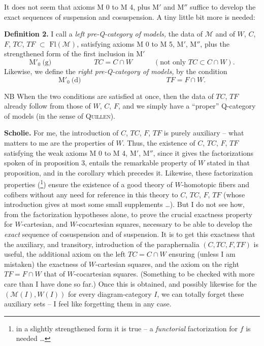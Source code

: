 \documentclass[11pt]{article}
\newcommand{\printedpage}[1]{\marginpar{\footnotesize p.~#1}}
\newcommand{\msp}[1]{\marginpar{\footnotesize [#1]}}
\newcommand{\cM}{\mathcal{M}}
\newcommand{\Fl}{\mathrm{Fl}}
\begin{document}
\msp{page 12}It does not seem that axioms M 0 to M 4, plus M$'$ and M$''$ suffice to develop the exact sequences of suspension and cosuspension. A tiny little bit more is needed:

\printedpage{8}
\textbf{Definition 2.} I call a \textit{left pre-Q-category of models,} the data of $\cM$ and of $W$, $C$, $F$, $TC$, $TF$ $\subset$ $\Fl(\cM)$, satisfying axioms M 0 to M 5, M$'$, M$''$, plus the strengthened form of the first inclusion in M$'$
\[
\text{M}'_0\ \text{(g)}\qquad\qquad\qquad TC=C\cap W\qquad\quad(\text{not only } TC\subset C\cap W).
\]
Likewise, we define the \textit{right pre-Q-category of models,} by the condition
\[
\text{M}'_0\ \text{(d)}\qquad\qquad\qquad\qquad\qquad\qquad TF=F\cap W.
\]

NB When the two conditions are satisfied at once, then the data of $TC$, $TF$ already follow from those of $W$, $C$, $F$, and we simply have a ``proper'' Q-category of models (in the sense of \textsc{Quillen}).

\textbf{Scholie.} For me, the introduction of $C$, $TC$, $F$, $TF$ is purely auxiliary – what matters to me are the properties of $W$. Thus, the existence of $C$, $TC$, $F$, $TF$ satisfying the weak axioms M 0 to M 4, M$'$, M$''$, since it gives the factorizations
\msp{page 13}
spoken of in proposition 3, entails the remarkable property of $W$ stated in that proposition, and in the corollary which precedes it. Likewise, these factorization properties (\footnote{in a slightly strengthened form it is true – a \textit{functorial} factorization for $f$ is needed \dots}) ensure the existence of a good theory of $W$-homotopic fibers and cofibers without any need for reference in this theory to $C$, $TC$, $F$, $TF$ (whose introduction gives at most some small supplements \dots). But I do not see how, from the factorization hypotheses alone, to prove the crucial exactness property for $W$-cartesian, and $W$-cocartesian squares, necessary to be able to develop the \textit{exact} sequence of cosuspension and of suspension. It is to get this exactness that the auxiliary, and transitory, introduction of the paraphernalia $(C,TC,F,TF)$ is useful, the additional axiom on the left $TC=C\cap W$ ensuring (unless I am mistaken) the exactness of $W$-cartesian squares, and the axiom on the right $TF=F\cap W$ that of $W$-cocartesian squares. (Something to be checked with more care than I have done so far.) Once this is obtained, and possibly likewise for the $(\cM(I),W(I))$ for every diagram-category $I$, we can
\msp{page 14}
totally forget these auxiliary sets – I feel like forgetting them in any case.
\end{document}
